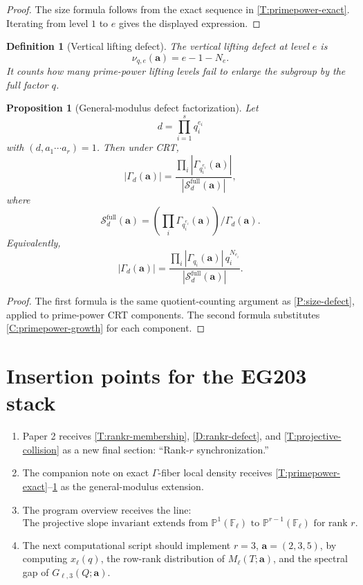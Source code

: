 \documentclass[11pt]{article}
\newtheorem{proposition}{Proposition}
\newtheorem{definition}{Definition}
\newcommand{\F}{\mathbb F}
\newcommand{\Pj}{\mathbb P}
\begin{document}
\begin{proof}
The size formula follows from the exact sequence in \cref{T:primepower-exact}.  Iterating from level \(1\) to \(e\) gives the displayed expression.
\end{proof}

\begin{definition}[Vertical lifting defect]\label{D:vertical-defect}
The vertical lifting defect at level \(e\) is
\[
\nu_{q,e}(\mathbf a)=e-1-N_e.
\]
It counts how many prime-power lifting levels fail to enlarge the subgroup by the full factor \(q\).
\end{definition}

\begin{proposition}[General-modulus defect factorization]\label{P:general-modulus}
Let
\[
d=\prod_{i=1}^s q_i^{e_i}
\]
with \((d,a_1\cdots a_r)=1\).  Then under CRT,
\[
|\Gamma_d(\mathbf a)|
=
\frac{\prod_i |\Gamma_{q_i^{e_i}}(\mathbf a)|}{|\mathcal S_d^{\mathrm{full}}(\mathbf a)|},
\]
where
\[
\mathcal S_d^{\mathrm{full}}(\mathbf a)
=
\left(\prod_i\Gamma_{q_i^{e_i}}(\mathbf a)\right)/\Gamma_d(\mathbf a).
\]
Equivalently,
\[
|\Gamma_d(\mathbf a)|
=
\frac{\prod_i |\Gamma_{q_i}(\mathbf a)|\,q_i^{N_{e_i}}}
{|\mathcal S_d^{\mathrm{full}}(\mathbf a)|}.
\]
\end{proposition}

\begin{proof}
The first formula is the same quotient-counting argument as \cref{P:size-defect}, applied to prime-power CRT components.  The second formula substitutes \cref{C:primepower-growth} for each component.
\end{proof}

\section{Insertion points for the EG203 stack}

\begin{enumerate}[leftmargin=1.5em]
\item Paper 2 receives \cref{T:rankr-membership}, \cref{D:rankr-defect}, and \cref{T:projective-collision} as a new final section: ``Rank-\(r\) synchronization.'' 
\item The companion note on exact \(\Gamma\)-fiber local density receives \cref{T:primepower-exact}--\cref{P:general-modulus} as the general-modulus extension.
\item The program overview receives the line:
\[
\boxed{\text{The projective slope invariant extends from }\Pj^1(\F_\ell)\text{ to }\Pj^{r-1}(\F_\ell)\text{ for rank }r.}
\]
\item The next computational script should implement \(r=3\), \(\mathbf a=(2,3,5)\), by computing \(x_\ell(q)\), the row-rank distribution of \(M_\ell(T;\mathbf a)\), and the spectral gap of \(G_{\ell,3}(Q;\mathbf a)\).
\end{enumerate}
\end{document}
